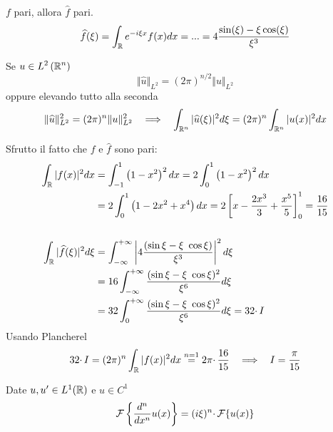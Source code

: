 $f$ pari, allora $\hat{f}$ pari.
\begin{equation*}
\widehat{f}( \xi ) =\int _{\mathbb{R} } e^{-i\xi x} f( x) dx=...=4\frac{\sin( \xi ) -\xi \cos( \xi )}{\xi ^{3}}
\end{equation*}
\begin{thm}
 Se $\displaystyle u\in L^{2}\left(\mathbb{R} ^{n}\right)$
\begin{equation*}
\Vert \hat{u}\Vert _{L^{2}} =( 2\pi )^{n/2}\Vert u\Vert _{L^{2}}
\end{equation*}
oppure elevando tutto alla seconda
\begin{equation*}
\Vert \hat{u}\Vert ^{2}_{L^{2}} =( 2\pi )^{n}\Vert u\Vert ^{2}_{L^{2}} \ \ \implies \ \ \int _{\RR ^{n}}| \hat{u}( \xi )| ^{2} d\xi =( 2\pi )^{n}\int _{\RR ^{n}}| u( x)| ^{2} dx
\end{equation*}
\end{thm}
Sfrutto il fatto che $f$ e $\hat{f}$ sono pari:
\begin{align*}
\int _{\mathbb{R} }| f( x)| ^{2} dx & =\int ^{1}_{-1}\left( 1-x^{2}\right)^{2} dx=2\int ^{1}_{0}\left( 1-x^{2}\right)^{2} dx\\
 & =2\int ^{1}_{0}\left( 1-2x^2+x^{4}\right) dx=2\left[ x-\frac{2x^{3}}{3} +\frac{x^{5}}{5}\right]^{1}_{0} =\frac{16}{15}\\
 & \\
\int _{\mathbb{R} }| \widehat{f}( \xi )| ^{2} d\xi  & =\int ^{+\infty }_{-\infty }\left| 4\frac{(\sin \xi -\xi \ \cos \xi )}{\xi ^{3}}\right| ^{2} d\xi \\
 & =16\int ^{+\infty }_{-\infty }\frac{(\sin \xi -\xi \ \cos \xi )^{2}}{\xi ^{6}} d\xi \\
 & =32\int ^{+\infty }_{0}\frac{(\sin \xi -\xi \ \cos \xi )^{2}}{\xi ^{6}} d\xi =32\cdotp I
\end{align*}
Usando Plancherel
\begin{equation*}
32\cdotp I=( 2\pi )^{n}\int _{\RR }| f( x)| ^{2} dx\overset{n=1}{=} 2\pi \cdotp \frac{16}{15} \ \ \implies \ \ I=\frac{\pi }{15}
\end{equation*}
\Soluzione
\begin{thm}
 Date $u,u'\in L^{1}(\mathbb{R} )$ e $u\in C^{1}$
\begin{equation*}
\mathcal{F} \left\{\frac{d^{n}}{dx^{n}} u( x)\right\} =( i\xi )^{n} \cdotp \mathcal{F} \{u( x)\}
\end{equation*}
\end{thm}

